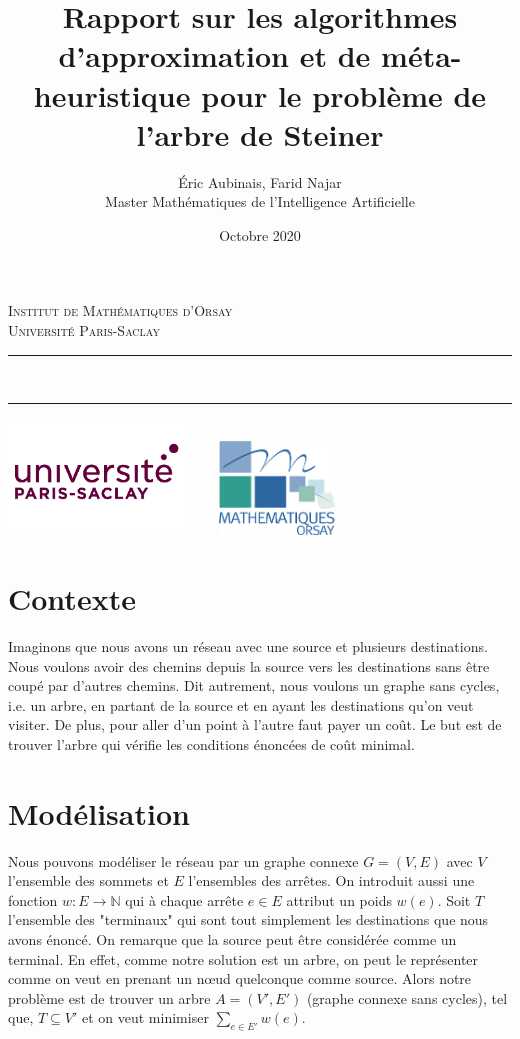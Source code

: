 \documentclass[11pt,french]{report}
\newcommand{\HRule}{\rule{\linewidth}{0.5mm}}
\begin{document}
	\title{Rapport sur les algorithmes d'approximation et de méta-heuristique pour le problème de l'arbre de Steiner\\}
	\author{
		Éric Aubinais, Farid Najar\\[0.2cm]
		Master Mathématiques de l'Intelligence Artificielle }
	\date{Octobre 2020}
	\makeatletter
	\begin{titlepage}
		\centering
		\textsc{\LARGE Institut de Mathématiques d'Orsay \\ Université Paris-Saclay}\\[4cm]
		\HRule \\
		{ \huge \bfseries \@title[2cm] }
		\begin{Large}
			\@author
		\end{Large}
		\HRule
		\vfill
		\includegraphics[width=0.35\textwidth]{paris-saclay.png}
		\hfill
		\includegraphics[width=0.35\textwidth, height=2.5cm]{imo.png}
		\pagebreak
		\tableofcontents
		\pagebreak
	\end{titlepage}

	\section{Contexte}
	Imaginons que nous avons un réseau avec une source et plusieurs destinations. Nous voulons avoir des chemins depuis la source vers les destinations sans être coupé par d'autres chemins. Dit autrement, nous voulons un graphe sans cycles, i.e. un arbre, en partant de la source et en ayant les destinations qu'on veut visiter. De plus, pour aller d'un point à l'autre faut payer un coût. Le but est de trouver l'arbre qui vérifie les conditions énoncées de coût minimal.
	\section{Modélisation}
	Nous pouvons modéliser le réseau par un graphe connexe $G = (V, E)$ avec $V$ l'ensemble des sommets et $E$ l'ensembles des arrêtes. On introduit aussi une fonction $w:E\rightarrow \mathbb{N}$ qui à chaque arrête $e\in E$ attribut un poids $w(e)$. Soit $T$ l'ensemble des "terminaux" qui sont tout simplement les destinations que nous avons énoncé. On remarque que la source peut être considérée comme un terminal. En effet, comme notre solution est un arbre, on peut le représenter comme on veut en prenant un nœud quelconque comme source. Alors notre problème est de trouver un arbre $A = (V', E')$ (graphe connexe sans cycles), tel que, $T\subseteq V'$ et on veut minimiser $\sum_{e\in E'}w(e)$.
\end{document}
